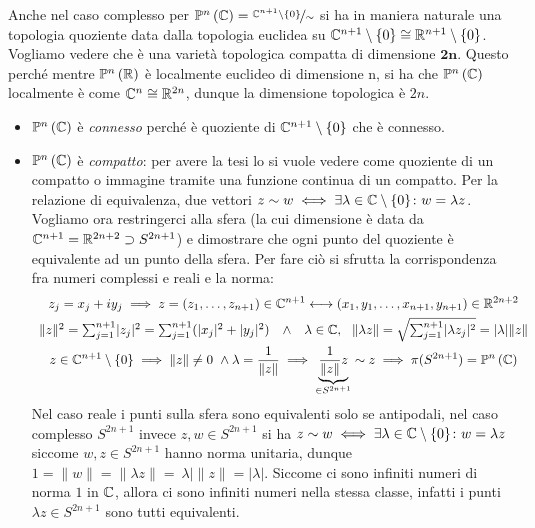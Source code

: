 Anche nel caso complesso per $\proj[n]{\complexset}=\nicefrac{\complexset^{n+1}\setminus\{0\}}{\sim}$ si ha in maniera naturale una topologia quoziente data dalla topologia euclidea su $\mathbb{C}^{n+1}\setminus\{0\} \cong \mathbb{R}^{n+1}\setminus\{0\}$.\newline
Vogliamo vedere che è una varietà topologica compatta di dimensione $\mathbf{2n}$. Questo perché mentre $\proj[n]{\realset}$ è localmente euclideo di dimensione n, si ha che $\proj[n]{\complexset}$ localmente è come $\mathbb{C}^n\cong\mathbb{R}^{2n}$, dunque la dimensione topologica è $2n$.
\begin{itemize}
	\item $\proj[n]{\complexset}$ è \textit{connesso} perché è quoziente di $\mathbb{C}^{n+1}\setminus\{0\}$ che è connesso.
	\item $\proj[n]{\complexset}$ è \textit{compatto}: per avere la tesi lo si vuole vedere come quoziente di un compatto o immagine tramite una funzione continua di un compatto. Per la relazione di equivalenza, due vettori $z\sim w\iff \exists\lambda\in\mathbb{C}\setminus\{0\}\colon w=\lambda z$. Vogliamo ora restringerci alla sfera (la cui dimensione è data da $\mathbb{C}^{n+1}=\mathbb{R}^{2n+2}\supset S^{2n+1}$) e dimostrare che ogni punto del quoziente è equivalente ad un punto della sfera. Per fare ciò si sfrutta la corrispondenza fra numeri complessi e reali e la norma:
	\begin{gather*}
		z_j=x_j+iy_j\implies  z=(z_1,\dots,z_{n+1})\in\complexset^{n+1}\longleftrightarrow (x_1,y_1,\dots,x_{n+1},y_{n+1})\in\realset^{2n+2}\\
		\begin{array}{ccc}
			\|z\|^2=\sum_{j=1}^{n+1} \lvert z_j\rvert ^2=\sum_{j=1}^{n+1}(\lvert x_j \rvert ^2 +\lvert y_j \rvert ^2) & \wedge & \lambda\in\complexset,\  \ \|\lambda z \| =\sqrt{\sum_{j=1}^{n+1}\lvert \lambda z_j \rvert ^2}=\lvert\lambda\rvert \| z\|
		\end{array} \\
		z\in\complexset^{n+1}\setminus\{0\}\implies \|z\|\neq 0 \ \wedge \lambda=\frac{1}{\| z\|} \implies \underbrace{\frac{1}{\|z\|}z}_{\in S^{2n+1}}\sim z \implies \pi(S^{2n+1})=\proj[n]{\complexset}
	\end{gather*}
	Nel caso reale i punti sulla sfera sono equivalenti solo se antipodali, nel caso complesso $S^{2n+1}$ invece $z,w\in S^{2n+1}$ si ha $z\sim w\iff \exists \lambda\in\mathbb{C}\setminus\{0\} \colon w=\lambda z$ siccome $w,z\in S^{2n+1}$ hanno norma unitaria, dunque $1=\| w\|=\|\lambda z\|= \ \lambda | \|z\|=|\lambda|$. Siccome ci sono infiniti numeri di norma $1$ in $\mathbb{C}$, allora ci sono infiniti numeri nella stessa classe, infatti i punti $\lambda z\in S^{2n+1}$ sono tutti equivalenti. 		

\end{itemize}
